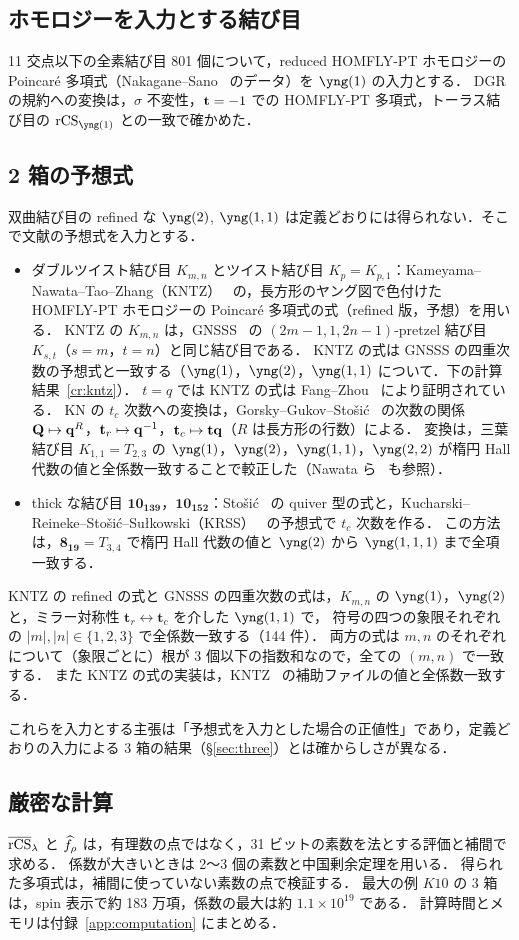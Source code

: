 \subsection{ホモロジーを入力とする結び目}
11 交点以下の全素結び目 801 個について，reduced HOMFLY-PT ホモロジーの Poincaré 多項式（Nakagane--Sano~\cite{Nakagane21} のデータ）を $\yng(1)$ の入力とする．
DGR の規約への変換は，$\sigma$ 不変性，$\mathbf{t}=-1$ での HOMFLY-PT 多項式，トーラス結び目の $\rCS_{\yng(1)}$ との一致で確かめた．

\subsection{2 箱の予想式}
双曲結び目の refined な $\yng(2)$, $\yng(1,1)$ は定義どおりには得られない．そこで文献の予想式を入力とする．
\begin{itemize}
\item ダブルツイスト結び目 $K_{m,n}$ とツイスト結び目 $K_p=K_{p,1}$：Kameyama--Nawata--Tao--Zhang（KNTZ）~\cite{Kameyama19} の，長方形のヤング図で色付けた HOMFLY-PT ホモロジーの Poincaré 多項式の式（refined 版，予想）を用いる．
KNTZ の $K_{m,n}$ は，GNSSS~\cite{Gukov15} の $(2m-1,1,2n-1)$-pretzel 結び目 $K_{s,t}$（$s=m$，$t=n$）と同じ結び目である．
KNTZ の式は GNSSS の四重次数の予想式と一致する（$\yng(1)$，$\yng(2)$，$\yng(1,1)$ について．下の計算結果~\ref{cr:kntz}）．
$t=q$ では KNTZ の式は Fang--Zhou~\cite{Fang26} により証明されている．
KN の $t_c$ 次数への変換は，Gorsky--Gukov--Stošić~\cite{Gorsky13} の次数の関係 $\mathbf{Q}\mapsto\mathbf{q}^R$，$\mathbf{t}_r\mapsto\mathbf{q}^{-1}$，$\mathbf{t}_c\mapsto\mathbf{t}\mathbf{q}$（$R$ は長方形の行数）による．
変換は，三葉結び目 $K_{1,1}=T_{2,3}$ の $\yng(1)$，$\yng(2)$，$\yng(1,1)$，$\yng(2,2)$ が楕円 Hall 代数の値と全係数一致することで較正した（Nawata ら~\cite{Nawata12} も参照）．
\item thick な結び目 $\mathbf{10_{139}}$，$\mathbf{10_{152}}$：Stošić~\cite{Stosic24} の quiver 型の式と，Kucharski--Reineke--Stošić--Sułkowski（KRSS）~\cite{Kucharski17b} の予想式で $t_c$ 次数を作る．
この方法は，$\mathbf{8_{19}}=T_{3,4}$ で楕円 Hall 代数の値と $\yng(2)$ から $\yng(1,1,1)$ まで全項一致する．
\end{itemize}
\begin{compresult}\label{cr:kntz}
KNTZ の refined の式と GNSSS の四重次数の式は，$K_{m,n}$ の $\yng(1)$，$\yng(2)$ と，ミラー対称性 $\mathbf{t}_r\leftrightarrow\mathbf{t}_c$ を介した $\yng(1,1)$ で，
符号の四つの象限それぞれの $|m|,|n|\in\{1,2,3\}$ で全係数一致する（144 件）．
両方の式は $m,n$ のそれぞれについて（象限ごとに）根が 3 個以下の指数和なので，全ての $(m,n)$ で一致する．
また KNTZ の式の実装は，KNTZ~\cite{Kameyama19} の補助ファイルの値と全係数一致する．
\end{compresult}
これらを入力とする主張は「予想式を入力とした場合の正値性」であり，定義どおりの入力による 3 箱の結果（\S\ref{sec:three}）とは確からしさが異なる．

\subsection{厳密な計算}
$\overline{\textrm{rCS}}_\lambda$ と $\widehat{f}_\rho$ は，有理数の点ではなく，31 ビットの素数を法とする評価と補間で求める．
係数が大きいときは 2〜3 個の素数と中国剰余定理を用いる．
得られた多項式は，補間に使っていない素数の点で検証する．
最大の例 $K10$ の 3 箱は，spin 表示で約 183 万項，係数の最大は約 $1.1\times10^{19}$ である．
計算時間とメモリは付録~\ref{app:computation} にまとめる．

